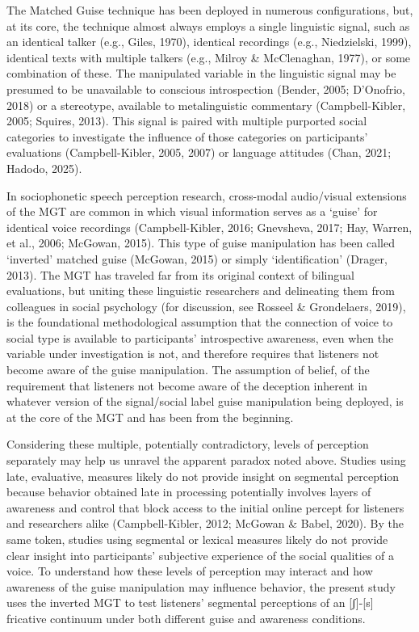 \documentclass[
  letterpaper,
  DIV=11,
  numbers=noendperiod]{scrartcl}
\begin{document}
The Matched Guise technique has been deployed in numerous
configurations, but, at its core, the technique almost always employs a
single linguistic signal, such as an identical talker (e.g., Giles,
1970), identical recordings (e.g., Niedzielski, 1999), identical texts
with multiple talkers (e.g., Milroy \& McClenaghan, 1977), or some
combination of these. The manipulated variable in the linguistic signal
may be presumed to be unavailable to conscious introspection (Bender,
2005; D'Onofrio, 2018) or a stereotype, available to metalinguistic
commentary (Campbell-Kibler, 2005; Squires, 2013). This signal is paired
with multiple purported social categories to investigate the influence
of those categories on participants' evaluations (Campbell-Kibler, 2005,
2007) or language attitudes (Chan, 2021; Hadodo, 2025).

In sociophonetic speech perception research, cross-modal audio/visual
extensions of the MGT are common in which visual information serves as a
`guise' for identical voice recordings (Campbell-Kibler, 2016;
Gnevsheva, 2017; Hay, Warren, et al., 2006; McGowan, 2015). This type of
guise manipulation has been called `inverted' matched guise (McGowan,
2015) or simply `identification' (Drager, 2013). The MGT has traveled
far from its original context of bilingual evaluations, but uniting
these linguistic researchers and delineating them from colleagues in
social psychology (for discussion, see Rosseel \& Grondelaers, 2019), is
the foundational methodological assumption that the connection of voice
to social type is available to participants' introspective awareness,
even when the variable under investigation is not, and therefore
requires that listeners not become aware of the guise manipulation. The
assumption of belief, of the requirement that listeners not become aware
of the deception inherent in whatever version of the signal/social label
guise manipulation being deployed, is at the core of the MGT and has
been from the beginning.

Considering these multiple, potentially contradictory, levels of
perception separately may help us unravel the apparent paradox noted
above. Studies using late, evaluative, measures likely do not provide
insight on segmental perception because behavior obtained late in
processing potentially involves layers of awareness and control that
block access to the initial online percept for listeners and researchers
alike (Campbell-Kibler, 2012; McGowan \& Babel, 2020). By the same
token, studies using segmental or lexical measures likely do not provide
clear insight into participants' subjective experience of the social
qualities of a voice. To understand how these levels of perception may
interact and how awareness of the guise manipulation may influence
behavior, the present study uses the inverted MGT to test listeners'
segmental perceptions of an {[}ʃ{]}-{[}s{]} fricative continuum under
both different guise and awareness conditions.
\end{document}
